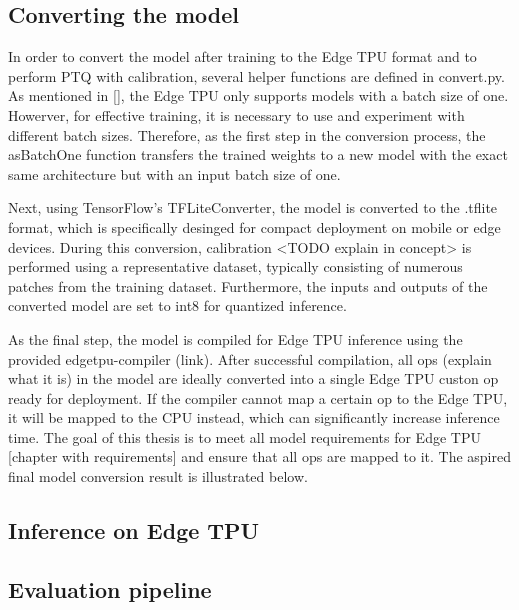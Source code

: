 {\subsection{Converting the model}

In order to convert the model after training to the Edge TPU format and to perform PTQ with calibration, several helper functions are defined in convert.py. As mentioned in [], the Edge TPU only supports models with a batch size of one. Howerver, for effective training, it is necessary to use and experiment with different batch sizes. Therefore, as the first step in the conversion process, the asBatchOne function transfers the trained weights to a new model with the exact same architecture but with an input batch size of one.

Next, using TensorFlow's TFLiteConverter, the model is converted to the .tflite format, which is specifically desinged for compact deployment on mobile or edge devices. During this conversion, calibration <TODO explain in concept> is performed using a representative dataset, typically consisting of numerous patches from the training dataset. Furthermore, the inputs and outputs of the converted model are set to int8 for quantized inference.

As the final step, the model is compiled for Edge TPU inference using the provided edgetpu-compiler (link). After successful compilation, all ops (explain what it is) in the model are ideally converted into a single Edge TPU custon op ready for deployment. If the compiler cannot map a certain op to the Edge TPU, it will be mapped to the CPU instead, which can significantly increase inference time. The goal of this thesis is to meet all model requirements for Edge TPU [chapter with requirements] and ensure that all ops are mapped to it. The aspired final model conversion result is illustrated below.


\subsection{Inference on Edge TPU}

\subsection{Evaluation pipeline}


}